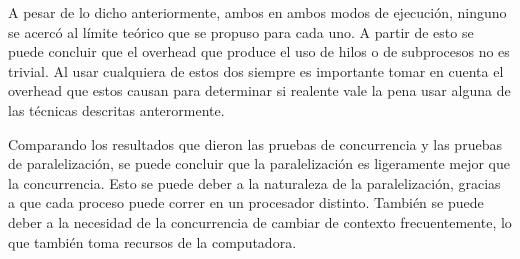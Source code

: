 \documentclass{report}
\begin{document}
A pesar de lo dicho anteriormente, ambos en ambos modos de ejecución, ninguno se acercó al límite teórico que se propuso para cada uno.
A partir de esto se puede concluir que el overhead que produce el uso de hilos o de subprocesos no es trivial.
Al usar cualquiera de estos dos siempre es importante tomar en cuenta el overhead que estos causan para determinar si realente vale la pena usar alguna de las técnicas descritas anterormente.

Comparando los resultados que dieron las pruebas de concurrencia y las pruebas de paralelización, se puede concluir que la paralelización es ligeramente mejor que la concurrencia.
Esto se puede deber a la naturaleza de la paralelización, gracias a que cada proceso puede correr en un procesador distinto. 
También se puede deber a la necesidad de la concurrencia de cambiar de contexto frecuentemente, lo que también toma recursos de la computadora.




%

\end{document}
